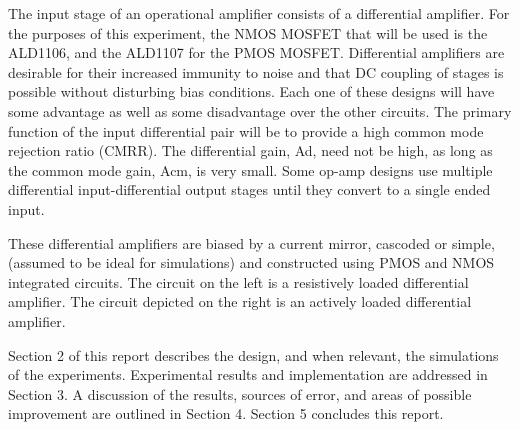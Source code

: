 The input stage of an operational amplifier consists of a differential amplifier. For the purposes of this experiment, the NMOS MOSFET that will be used is the ALD1106, and the ALD1107 for the PMOS MOSFET. Differential amplifiers are
desirable for their increased immunity to noise and that DC coupling of stages is possible without
disturbing bias conditions. Each one of these designs will have some
advantage as well as some disadvantage over the other circuits. The primary function of the input
differential pair will be to provide a high common mode rejection ratio (CMRR). The differential gain,
Ad, need not be high, as long as the common mode gain, Acm, is very small. Some op-amp designs use multiple differential input-differential output
stages until they convert to a single ended input.


These differential amplifiers are biased by a current mirror, cascoded or simple, (assumed to be ideal for simulations) and constructed using PMOS and NMOS integrated circuits. The circuit on the left is a resistively loaded differential amplifier. The circuit depicted on the right is an actively loaded differential amplifier. 


\noindent Section 2 of this report describes the design, and when relevant, the simulations of the experiments. Experimental results and implementation are addressed in Section 3. A discussion of the results, sources of error, and areas of possible improvement are outlined in Section 4. Section 5 concludes this report. \newline

